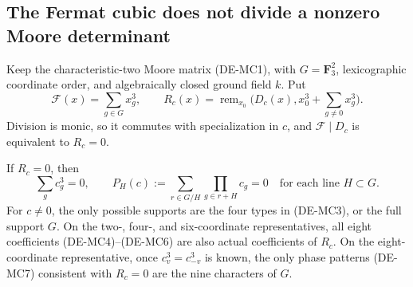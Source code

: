 \subsection{The Fermat cubic does not divide a nonzero Moore determinant}

Keep the characteristic-two Moore matrix (DE-MC1), with
\(G=\mathbf F_3^2\), lexicographic coordinate order, and algebraically
closed ground field \(k\). Put
\[
 \mathcal F(x)=\sum_{g\in G}x_g^3,\qquad
 R_c(x)=\operatorname{rem}_{x_0}
       \bigl(D_c(x),x_0^3+\sum_{g\ne0}x_g^3\bigr).
 \tag{DE-MF1}
\]
Division is monic, so it commutes with specialization in \(c\), and
\(\mathcal F\mid D_c\) is equivalent to \(R_c=0\).

\begin{lemma}
\label{lem:DE-Fermat-coefficient-reductions}
If \(R_c=0\), then
\[
 \sum_g c_g^3=0,\qquad
 P_H(c):=\sum_{r\in G/H}\prod_{g\in r+H}c_g=0
       \quad\text{for each line }H\subset G.
 \tag{DE-MF2}
\]
For \(c\ne0\), the only possible supports are the four types in
(DE-MC3), or the full support \(G\). On the two-, four-, and
six-coordinate representatives, all eight coefficients
(DE-MC4)--(DE-MC6) are also actual coefficients of \(R_c\).
On the eight-coordinate representative, once
\(c_v^3=c_{-v}^3\) is known, the only phase patterns (DE-MC7)
consistent with \(R_c=0\) are the nine characters of \(G\).
\end{lemma}
